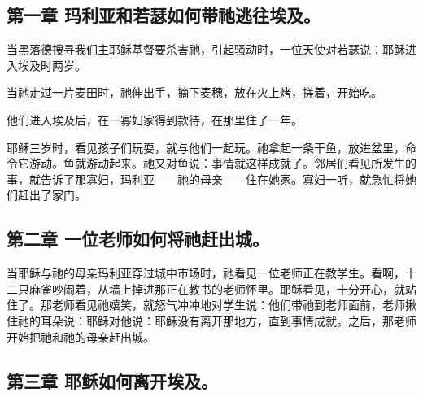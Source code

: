 \par


\subsection{第一章 玛利亚和若瑟如何带祂逃往埃及。}

当黑落德搜寻我们主耶稣基督要杀害祂，引起骚动时，一位天使对若瑟说：耶稣进入埃及时两岁。\par

当祂走过一片麦田时，祂伸出手，摘下麦穗，放在火上烤，搓着，开始吃。\par

他们进入埃及后，在一寡妇家得到款待，在那里住了一年。\par

耶稣三岁时，看见孩子们玩耍，就与他们一起玩。祂拿起一条干鱼，放进盆里，命令它游动。鱼就游动起来。祂又对鱼说：事情就这样成就了。邻居们看见所发生的事，就告诉了那寡妇，玛利亚——祂的母亲——住在她家。寡妇一听，就急忙将她们赶出了家门。\par


\subsection{第二章 一位老师如何将祂赶出城。}

当耶稣与祂的母亲玛利亚穿过城中市场时，祂看见一位老师正在教学生。看啊，十二只麻雀吵闹着，从墙上掉进那正在教书的老师怀里。耶稣看见，十分开心，就站住了。那老师看见祂嬉笑，就怒气冲冲地对学生说：他们带祂到老师面前，老师揪住祂的耳朵说：耶稣对他说：耶稣没有离开那地方，直到事情成就。之后，那老师开始把祂和祂的母亲赶出城。\par


\subsection{第三章 耶稣如何离开埃及。}

